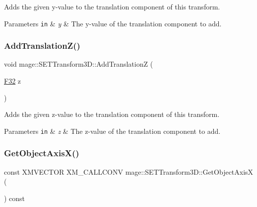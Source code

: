 Adds the given y-\/value to the translation component of this transform.


\begin{DoxyParams}[1]{Parameters}
\mbox{\tt in}  & {\em y} & The y-\/value of the translation component to add. \\
\hline
\end{DoxyParams}
\mbox{\label{classmage_1_1_s_e_t_transform3_d_a2c9163b92e80ef99eb96dff121bdb1a0}} 
\subsubsection{\texorpdfstring{Add\+Translation\+Z()}{AddTranslationZ()}}
{\footnotesize\ttfamily void mage\+::\+S\+E\+T\+Transform3\+D\+::\+Add\+TranslationZ (\begin{DoxyParamCaption}\item[{\mbox{\hyperlink{namespacemage_aa97e833b45f06d60a0a9c4fc22ae02c0}{F32}}}]{z }\end{DoxyParamCaption})\hspace{0.3cm}{\ttfamily [noexcept]}}

Adds the given z-\/value to the translation component of this transform.


\begin{DoxyParams}[1]{Parameters}
\mbox{\tt in}  & {\em z} & The z-\/value of the translation component to add. \\
\hline
\end{DoxyParams}
\mbox{\label{classmage_1_1_s_e_t_transform3_d_a208561fa5d00dc7984632c4aa0241a64}} 
\subsubsection{\texorpdfstring{Get\+Object\+Axis\+X()}{GetObjectAxisX()}}
{\footnotesize\ttfamily const X\+M\+V\+E\+C\+T\+OR X\+M\+\_\+\+C\+A\+L\+L\+C\+O\+NV mage\+::\+S\+E\+T\+Transform3\+D\+::\+Get\+Object\+AxisX (\begin{DoxyParamCaption}{ }\end{DoxyParamCaption}) const\hspace{0.3cm}{\ttfamily [noexcept]}}

